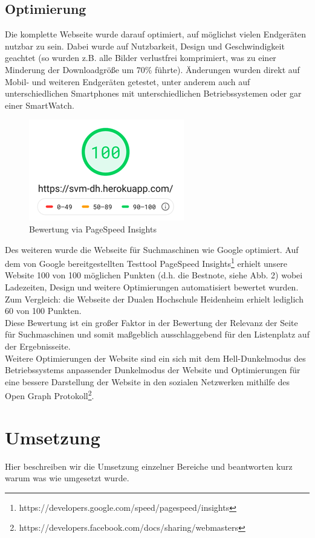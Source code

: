 \documentclass[12pt,a4paper]{article}
\begin{document}
\subsection{Optimierung}
Die komplette Webseite wurde darauf optimiert, auf möglichst vielen Endgeräten nutzbar zu sein. Dabei wurde auf Nutzbarkeit, Design und Geschwindigkeit geachtet (so wurden z.B. alle Bilder verlustfrei komprimiert, was zu einer Minderung der Downloadgröße um 70\% führte). Änderungen wurden direkt auf Mobil- und weiteren Endgeräten getestet, unter anderem auch auf unterschiedlichen Smartphones mit unterschiedlichen Betriebssystemen oder gar einer SmartWatch.
\begin{figure}[!htbp]
\centering
	\includegraphics[scale=1]{Bewertung.png}
	\caption{Bewertung via PageSpeed Insights}
	\label{img:Bewertung}
\end{figure}
Des weiteren wurde die Webseite für Suchmaschinen wie Google optimiert. Auf dem von Google bereitgestellten Testtool \dq PageSpeed Insights\dq \footnote{\label{foot:4}https://developers.google.com/speed/pagespeed/insights} erhielt unsere Website 100 von 100 möglichen Punkten (d.h. die Bestnote, siehe Abb. 2) wobei Ladezeiten, Design und weitere Optimierungen automatisiert bewertet wurden. Zum Vergleich: die Webseite der Dualen Hochschule Heidenheim erhielt lediglich 60 von 100 Punkten. \\
Diese Bewertung ist ein großer Faktor in der Bewertung der Relevanz der Seite für Suchmaschinen und somit maßgeblich ausschlaggebend für den Listenplatz auf der Ergebnisseite. \\
Weitere Optimierungen der Website sind ein sich mit dem Hell-\/Dunkelmodus des Betriebssystems anpassender Dunkelmodus der Website und Optimierungen für eine bessere Darstellung der Website in den sozialen Netzwerken mithilfe des Open Graph Protokoll\footnote{\label{foot:5} https://developers.facebook.com/docs/sharing/webmasters}.

\section{Umsetzung}
Hier beschreiben wir die Umsetzung einzelner Bereiche und beantworten kurz warum was wie umgesetzt wurde.
\end{document}
